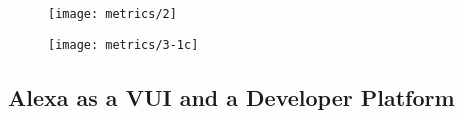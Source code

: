 %
%
\begin{figure*}[t]
	\centering
%
%
\begin{subfigure}[b]{0.9\linewidth}
	\texttt{[image: metrics/2]}
\end{subfigure}




\begin{subfigure}[b]{0.9\linewidth}
	\texttt{[image: metrics/3-1c]}
\end{subfigure}



%
\end{figure*}

%
%
%
%








\clearpage


\subsection*{Alexa as a VUI and a Developer Platform}


